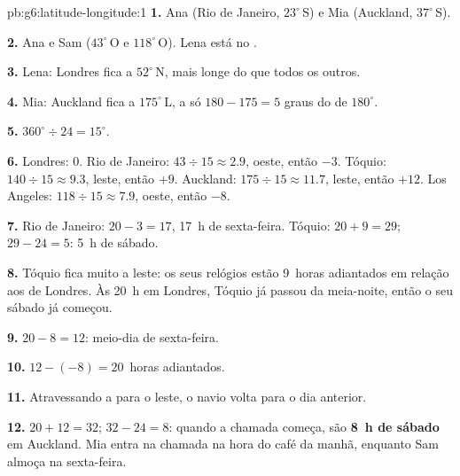 \begin{solution}{pb:g6:latitude-longitude:1}
\textbf{1.} Ana (Rio de Janeiro, $23^\circ$\,S) e Mia (Auckland,
$37^\circ$\,S).

\textbf{2.} Ana e Sam ($43^\circ$\,O e $118^\circ$\,O). Lena está no
.

\textbf{3.} Lena: Londres fica a $52^\circ$\,N, mais longe do  que
todos os outros.

\textbf{4.} Mia: Auckland fica a $175^\circ$\,L, a só $180 - 175 = 5$
graus do  de $180^\circ$.

\textbf{5.} $360^\circ \div 24 = 15^\circ$.

\textbf{6.} Londres: $0$. Rio de Janeiro: $43 \div 15 \approx 2.9$, oeste,
então $-3$. Tóquio: $140 \div 15 \approx 9.3$, leste, então $+9$. Auckland:
$175 \div 15 \approx 11.7$, leste, então $+12$. Los Angeles:
$118 \div 15 \approx 7.9$, oeste, então $-8$.

\textbf{7.} Rio de Janeiro: $20 - 3 = 17$, 17~h de sexta-feira. Tóquio:
$20 + 9 = 29$; $29 - 24 = 5$: 5~h de sábado.

\textbf{8.} Tóquio fica muito a leste: os seus relógios estão 9~horas
adiantados em relação aos de Londres. Às 20~h em Londres, Tóquio já passou
da meia-noite, então o seu sábado já começou.

\textbf{9.} $20 - 8 = 12$: meio-dia de sexta-feira.

\textbf{10.} $12 - (-8) = 20$~horas adiantados.

\textbf{11.} Atravessando a  para o leste, o navio volta para
o dia anterior.

\textbf{12.} $20 + 12 = 32$; $32 - 24 = 8$: quando a chamada começa, são
\textbf{8~h de sábado} em Auckland. Mia entra na chamada na hora do café da
manhã, enquanto Sam almoça na sexta-feira.
\end{solution}
